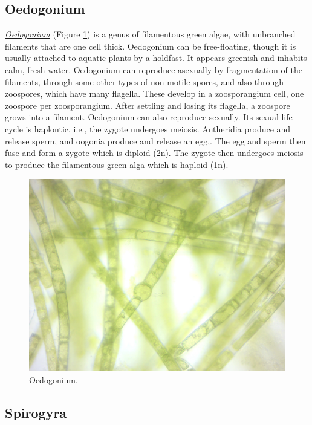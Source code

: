 \subsection{Oedogonium}\label{oedogonium}

\href{https://en.wikipedia.org/wiki/Oedogonium}{\emph{Oedogonium}}
(Figure \ref{fig:oedogonium}) is a genus of filamentous green algae,
with unbranched filaments that are one cell thick. Oedogonium can be
free-floating, though it is usually attached to aquatic plants by a
holdfast. It appears greenish and inhabits calm, fresh water. Oedogonium
can reproduce asexually by fragmentation of the filaments, through some
other types of non-motile spores, and also through zoospores, which have
many flagella. These develop in a zoosporangium cell, one zoospore per
zoosporangium. After settling and losing its flagella, a zoospore grows
into a filament. Oedogonium can also reproduce sexually. Its sexual life
cycle is haplontic, i.e., the zygote undergoes meiosis. Antheridia
produce and release sperm, and oogonia produce and release an egg,. The
egg and sperm then fuse and form a zygote which is diploid (2n). The
zygote then undergoes meiosis to produce the filamentous green alga
which is haploid (1n).

\begin{figure}

{\centering \includegraphics[width=0.7\linewidth]{./figures/protists/oedogonium}

}

\caption{Oedogonium.}\label{fig:oedogonium}
\end{figure}

\subsection{Spirogyra}\label{spirogyra}

